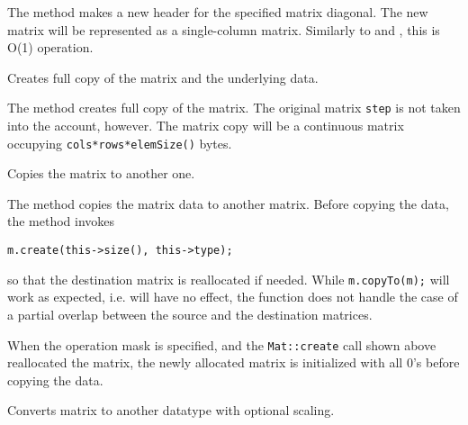 The method makes a new header for the specified matrix diagonal. The new matrix will be represented as a single-column matrix. Similarly to  and , this is O(1) operation.


Creates full copy of the matrix and the underlying data.


The method creates full copy of the matrix. The original matrix \texttt{step} is not taken into the account, however. The matrix copy will be a continuous matrix occupying \texttt{cols*rows*elemSize()} bytes.


Copies the matrix to another one.

\begin{description}
\end{description}

The method copies the matrix data to another matrix. Before copying the data, the method invokes

\begin{lstlisting}
m.create(this->size(), this->type);
\end{lstlisting}

so that the destination matrix is reallocated if needed. While \texttt{m.copyTo(m);} will work as expected, i.e. will have no effect, the function does not handle the case of a partial overlap between the source and the destination matrices. 

When the operation mask is specified, and the \texttt{Mat::create} call shown above reallocated the matrix, the newly allocated matrix is initialized with all 0's before copying the data.


Converts matrix to another datatype with optional scaling.

\begin{description}
\end{description}

